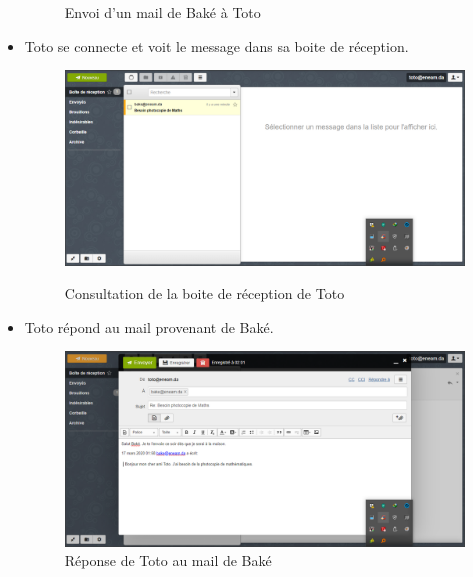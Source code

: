 \documentclass[a4paper,12pt,french]{report} %
\begin{document}
\begin{itemize}
\begin{figure}[H]
\caption{Envoi d'un mail de Baké à Toto}
\end{figure}

\item Toto se connecte et voit le message dans sa boite de réception.
\begin{figure}[H]
\centering
\includegraphics[width=483pt]{figure/toto_see_mail_from_bake1.png} \\[1cm]
\caption{Consultation de la boite de réception de Toto}
\end{figure} 
\item Toto répond au mail provenant de Baké.
\begin{figure}[H]
	\centering
	\includegraphics[width=483pt]{figure/toto_reply_to_bake1.png}
	\caption{Réponse de Toto au mail de Baké}
\end{figure} 


\end{itemize}
\end{document}
